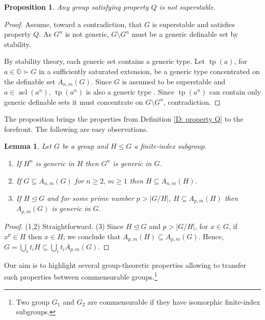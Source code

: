 \documentclass[11pt]{amsart}
\theoremstyle{plain}
\newtheorem{lemma}[theorem]{Lemma}
\newtheorem{proposition}[theorem]{Proposition}
\theoremstyle{definition}
\theoremstyle{remark}
\numberwithin{equation}{section}
\DeclareMathOperator{\acl}{acl}
\DeclareMathOperator{\tp}{tp}
\begin{document}
\begin{proposition}\label{P:Prop Q is not superstable}
    Any group satisfying property $Q$ is not  superstable.  
\end{proposition}
\begin{proof}
    Assume, toward a contradiction, that $G$ is superstable and satisfies property $Q$.  As $G^n$ is not generic, $G\setminus G^n$ must be a generic definable set by stability.

    By stability theory, each generic set contains a generic type. Let $\tp(a)$, for $a\in \mathbb{G}\succ G$ in a sufficiently saturated extension, be a generic type concentrated on the definable set $A_{n,m}(G)$. Since $G$ is assumed to be superstable and $a\in \acl(a^n)$, $\tp(a^n)$ is also a generic type \cite[Lemma 5.16]{Poi:StableGroups}. Since $\tp(a^n)$ can contain only generic definable sets it must concentrate on $G\setminus G^n$, contradiction.
\end{proof}


The proposition brings the properties from Definition \ref{D: property Q} to the forefront. The following are easy observations. 

\begin{lemma}\label{L:basic property Q}
    Let $G$ be a group and $H\leq G$ a finite-index subgroup.
    \begin{enumerate}
        \item If $H^n$ is generic in $H$ then $G^n$ is generic in $G$.
        \item If $G\subseteq A_{n,m}(G)$ for $n\geq 2,\, m\geq 1$ then $H\subseteq A_{n,m}(H)$.
        \item If $H\trianglelefteq G$ and for some prime number $p>|G/H|$, $H\subseteq A_{p,m}(H)$  then $A_{p,m}(G)$ is generic in $G$.
    \end{enumerate}
\end{lemma}
\begin{proof}
    (1,2) Straightforward.    
    (3) Since $H\trianglelefteq G$ and $p>|G/H|$, for $x\in G$, if $x^p\in H$ then $x\in H$; we conclude that $A_{p,m}(H)\subseteq A_{p,m}(G)$. Hence, $G=\bigcup_i t_i H\subseteq \bigcup_i t_iA_{p,m}(G)$.
\end{proof}

Our aim is to highlight several group-theoretic properties allowing to  transfer such properties between commensurable groups.\footnote{Two group $G_1$ and $G_2$ are commensurable if they have isomorphic finite-index subgroups.}
\end{document}
